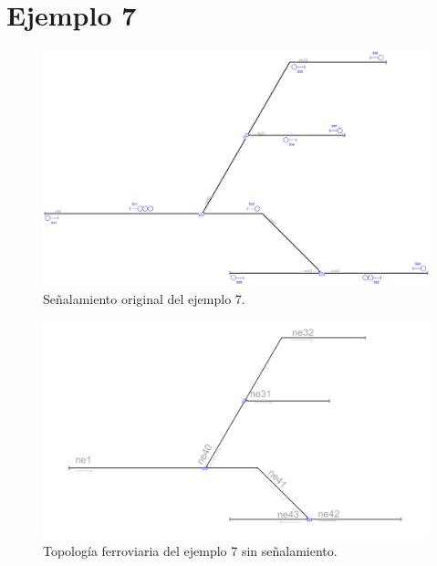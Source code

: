 \section{Ejemplo 7}

    \lipsum[1]

    \begin{figure}[h]
        \centering
        \includegraphics[width=1\textwidth]{resultados-obtenidos/ejemplo7/images/7_original.png}
        \centering\caption{Señalamiento original del ejemplo 7.}
    \end{figure}

    \begin{figure}[h]
        \centering
        \includegraphics[width=1\textwidth]{resultados-obtenidos/ejemplo7/images/7_empty.png}
        \centering\caption{Topología ferroviaria del ejemplo 7 sin señalamiento.}
    \end{figure}

